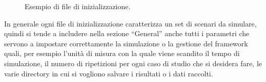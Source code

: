 \begin{figure}[t]
	\hfill
	\caption{Esempio di file di inizializzazione.}
	\label{fig:ini_file}
\end{figure}

In generale ogni file di inizializzazione caratterizza un set di scenari da simulare, quindi si tende a includere nella sezione “General” anche tutti i parametri che servono a impostare correttamente la simulazione o la gestione del framework quali, per esempio l'unità di misura con la quale viene scandito il tempo di simulazione, il numero di ripetizioni per ogni caso di studio che si desidera fare, le varie directory in cui si vogliono salvare i risultati o i dati raccolti.

